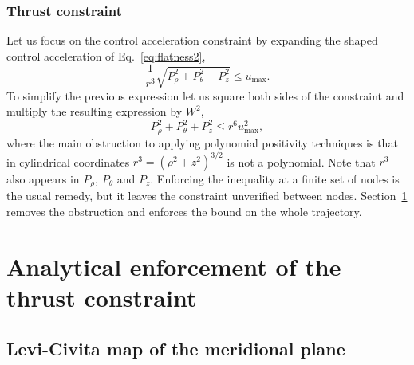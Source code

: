 \documentclass[a4paper,fleqn]{cas-sc}
\begin{document}
\subsubsection{Thrust constraint}
\label{sec:thrust}

Let us focus on the control acceleration constraint by expanding the shaped
control acceleration of Eq.~\eqref{eq:flatness2},
\begin{equation}
	\dfrac{1}{r^3}\sqrt{P^2_\rho+P^2_\theta+P^2_z}\leq u_{\max}.
\end{equation}
To simplify the previous expression let us square both sides of the
constraint and multiply the resulting expression by $W^2$,
\begin{equation}
	P^2_\rho+P^2_\theta+P^2_z \leq r^6 u^2_{\max},
	\label{eq:squared-thrust-constraint}
\end{equation}
where the main obstruction to applying polynomial positivity techniques is
that in cylindrical coordinates $r^3=(\rho^2+z^2)^{3/2}$ is not a
polynomial. Note that $r^3$ also appears in $P_\rho$, $P_\theta$ and $P_z$.
Enforcing the inequality at a finite set of nodes is the usual remedy, but it
leaves the constraint unverified between nodes. Section~\ref{sec:enforcement}
removes the obstruction and enforces the bound on the whole trajectory.

\section{Analytical enforcement of the thrust constraint}
\label{sec:enforcement}

\subsection{Levi-Civita map of the meridional plane}
\label{sec:pythagorean}
\end{document}
